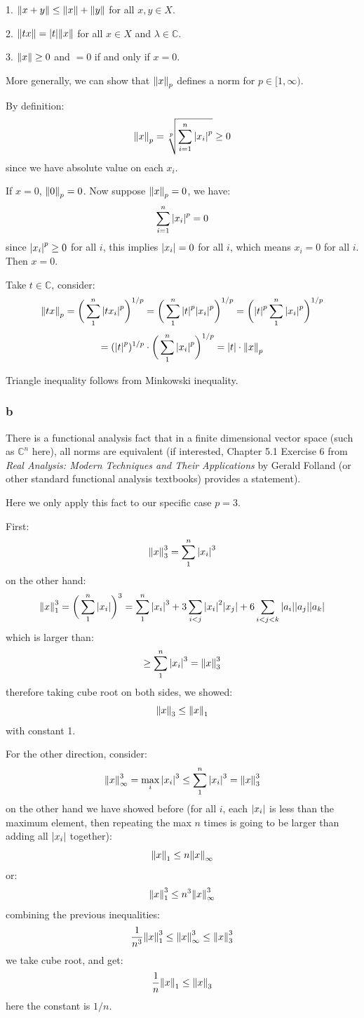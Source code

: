\documentclass[12pt]{article} %
\newcommand{\cc}{\mathbb{C}}
\newcommand{\1}[1]{\mathds{1}\left[#1\right]}
\begin{document}
1. $\norm{x+y}\le\norm{x}+\norm{y}$ for all $x,y\in X$.

2. $\norm{tx} = \abs{t}\norm{x}$ for all $x\in X$ and $\lambda\in \mathbb{C}$.

3. $\norm{x} \ge 0$ and $=0$ if and only if $x=0$.

More generally, we can show that $\norm{x}_p$ defines a norm for $p\in [1, \infty)$.

By definition:
$$
	\norm{x}_p = \sqrt[p]{\sum_{i=1}^{n}\abs{x_i}^p} \ge 0
$$ since we have absolute value on each $x_i$.

If $x=0$, $\norm{0}_p=0$. Now suppose $\norm{x}_p=0$, we have:
$$
	\sum_{i=1}^n\abs{x_i}^p = 0
$$ since $\abs{x_i}^p \ge 0$ for all $i$, this implies $\abs{x_i} =0$ for all $i$, which means $x_i = 0$ for all $i$. Then $x=0$.

Take $t\in\cc$, consider:
$$
	\norm{tx}_p = 
	\bigg(
	\sum_{1}^n\abs{tx_i}^p
	\bigg)^{1/p} = \bigg(
	\sum_{1}^n\abs{t}^p\abs{x_i}^p
	\bigg)^{1/p} = \bigg(\abs{t}^p
	\sum_{1}^n\abs{x_i}^p
	\bigg)^{1/p}
$$
$$
	= (\abs{t}^p)^{1/p}\cdot\bigg(\sum_1^n\abs{x_i}^p\bigg)^{1/p} = \abs{t}\cdot\norm{x}_p
$$

Triangle inequality follows from Minkowski inequality.

\subsubsection{b}
There is a functional analysis fact that in a finite dimensional vector space (such as $\cc^n$ here), all norms are equivalent (if interested, Chapter 5.1 Exercise 6 from \emph{Real Analysis: Modern Techniques and Their Applications} by Gerald Folland (or other standard functional analysis textbooks) provides a statement). 

Here we only apply this fact to our specific case $p=3$.

First:
$$
\norm{x}_3^3 = \sum_1^{n}\abs{x_i}^3 
$$ on the other hand:
$$
	\norm{x}_1^3 = \bigg(
	\sum_1^{n}\abs{x_i}
	\bigg)^3 = \sum_{1}^n\abs{x_i}^3 + 3\sum_{i<j}\abs{x_i}^2\abs{x_j} + 6\sum_{i<j<k}\abs{a_i}\abs{a_j}\abs{a_k}
$$ which is larger than:
$$
	\ge \sum_1^{n}\abs{x_i}^3  = \norm{x}_3^3
$$ therefore taking cube root on both sides, we showed:
$$
	\norm{x}_3 \le \norm{x}_1
$$ with constant 1.

For the other direction, consider:
$$
	\norm{x}_{\infty}^3 = \max_i\abs{x_i}^3 \le \sum_{1}^n\abs{x_i}^3 = \norm{x}_3^3
$$ on the other hand we have showed before (for all $i$, each $\abs{x_i}$ is less than the maximum element, then repeating the max $n$ times is going to be larger than adding all $\abs{x_i}$ together):
$$
	\norm{x}_1 \le n\norm{x}_{\infty}
$$ or:
$$
	\norm{x}^3_1 \le n^3\norm{x}^3_{\infty}
$$ combining the previous inequalities:
$$
	\frac{1}{n^3}\norm{x}_1^3\le\norm{x}_{\infty}^3\le \norm{x}_3^3
$$ we take cube root, and get:
$$
	\frac1n\norm{x}_1 \le \norm{x}_3
$$ here the constant is $1/n$. 
\end{document}
